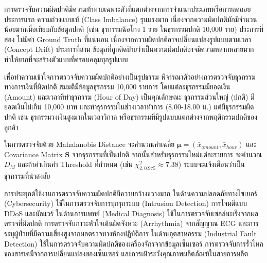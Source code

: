 การตรวจจับความผิดปกติมีความท้าทายเฉพาะตัวที่แตกต่างจากการจำแนกประเภทหรือการถดถอย ประการแรก ความถ่วงแบบเบ้ (Class Imbalance) รุนแรงมาก เนื่องจากความผิดปกติมักมีจำนวนน้อยมากเมื่อเทียบกับข้อมูลปกติ (เช่น ธุรกรรมฉ้อโกง 1 ราย ในธุรกรรมปกติ 10,000 ราย) ประการที่สอง ไม่มีค่า Ground Truth ที่แน่นอน เนื่องจากความผิดปกติอาจเปลี่ยนแปลงรูปแบบตามเวลา (Concept Drift) ประการที่สาม ข้อมูลที่ถูกติดป้ายว่าเป็นความผิดปกติอาจมีความหลากหลายมาก ทำให้ยากที่จะสร้างตัวแบบที่ครอบคลุมทุกรูปแบบ

\begin{exmp}
เพื่อทำความเข้าใจการตรวจจับความผิดปกติอย่างเป็นรูปธรรม พิจารณาตัวอย่างการตรวจจับธุรกรรมทางการเงินที่ผิดปกติ สมมติมีข้อมูลธุรกรรม 10,000 รายการ โดยแต่ละธุรกรรมมียอดเงิน (Amount) และเวลาที่ทำธุรกรรม (Hour of Day) เป็นคุณลักษณะ ธุรกรรมส่วนใหญ่ (ปกติ) มียอดเงินไม่เกิน 10,000 บาท และทำธุรกรรมในช่วงเวลาทำการ (8.00-18.00 น.) แต่มีธุรกรรมผิดปกติ เช่น ธุรกรรมวงเงินสูงมากในเวลาวิกาล หรือธุรกรรมที่มีรูปแบบแตกต่างจากพฤติกรรมปกติของลูกค้า

ในการตรวจจับด้วย Mahalanobis Distance จะคำนวณค่าเฉลี่ย $\boldsymbol{\mu} = (\bar{x}_{amount}, \bar{x}_{hour})$ และ Covariance Matrix $\mathbf{S}$ จากธุรกรรมที่เป็นปกติ จากนั้นสำหรับธุรกรรมใหม่แต่ละรายการ จะคำนวณ $D_M$ และถ้าค่าเกินค่า Threshold ที่กำหนด (เช่น $\chi^2_{2, 0.975} \approx 7.38$) ระบบจะแจ้งเตือนว่าเป็นธุรกรรมที่น่าสงสัย
\end{exmp}

การประยุกต์ใช้งานการตรวจจับความผิดปกติมีความกว้างขวางมาก ในด้านความปลอดภัยทางไซเบอร์ (Cybersecurity) ใช้ในการตรวจจับการบุกรุกระบบ (Intrusion Detection) การโจมตีแบบ DDoS และมัลแวร์ ในด้านการแพทย์ (Medical Diagnosis) ใช้ในการตรวจจับเซลล์มะเร็งจากผลตรวจที่ผิดปกติ การตรวจจับภาวะหัวใจเต้นผิดจังหวะ (Arrhythmia) จากสัญญาณ ECG และการระบุผู้ป่วยที่มีความเสี่ยงสูงจากผลตรวจทางห้องปฏิบัติการ ในด้านอุตสาหกรรม (Industrial Fault Detection) ใช้ในการตรวจจับความผิดปกติของเครื่องจักรจากข้อมูลเซ็นเซอร์ การตรวจจับการรั่วไหลของสารเคมีจากการเปลี่ยนแปลงของเซ็นเซอร์ และการเฝ้าระวังคุณภาพผลิตภัณฑ์ในสายการผลิต

